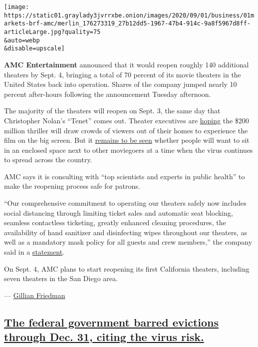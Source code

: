 \texttt{[image: https://static01.graylady3jvrrxbe.onion/images/2020/09/01/business/01markets-brf-amc/merlin\_176273319\_27b12dd5-1967-47b4-914c-9a8f5967d8ff-articleLarge.jpg?quality=75\\\&auto=webp\\\&disable=upscale]}

\textbf{AMC Entertainment} announced that it would reopen roughly 140
additional theaters by Sept. 4, bringing a total of 70 percent of its
movie theaters in the United States back into operation. Shares of the
company jumped nearly 10 percent after-hours following the announcement
Tuesday afternoon.

The majority of the theaters will reopen on Sept. 3, the same day that
Christopher Nolan's ``Tenet'' comes out. Theater executives are
\href{https://www.nytimes3xbfgragh.onion/2020/08/28/business/media/coronavirus-movie-theaters-new-mutants.html}{hoping}
the \$200 million thriller will draw crowds of viewers out of their
homes to experience the film on the big screen. But it
\href{https://www.nytimes3xbfgragh.onion/2020/08/28/business/media/coronavirus-movie-theaters-new-mutants.html}{remains
to be seen} whether people will want to sit in an enclosed space next to
other moviegoers at a time when the virus continues to spread across the
country.

AMC says it is consulting with ``top scientists and experts in public
health'' to make the reopening process safe for patrons.

``Our comprehensive commitment to operating our theaters safely now
includes social distancing through limiting ticket sales and automatic
seat blocking, seamless contactless ticketing, greatly enhanced cleaning
procedures, the availability of hand sanitizer and disinfecting wipes
throughout our theaters, as well as a mandatory mask policy for all
guests and crew members,'' the company said in a
\href{http://investor.amctheatres.com/file/Index?KeyFile=405157778}{statement}.

On Sept. 4, AMC plans to start reopening its first California theaters,
including seven theaters in the San Diego area.

--- \href{http://nytimes3xbfgragh.onion/by/gillian-friedman}{Gillian
Friedman}

\hypertarget{the-federal-government-barred-evictions-through-dec-31-citing-the-virus-risk}{%
\subsection{\texorpdfstring{\protect\hyperlink{the-federal-government-barred-evictions-through-dec-31-citing-the-virus-risk}{The
federal government barred evictions through Dec. 31, citing the virus
risk.}}{The federal government barred evictions through Dec. 31, citing the virus risk.}}\label{the-federal-government-barred-evictions-through-dec-31-citing-the-virus-risk}}

